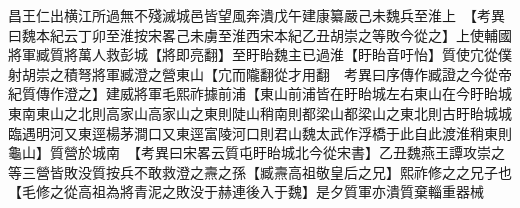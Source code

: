 昌王仁出横江所過無不殘滅城邑皆望風奔潰戊午建康纂嚴己未魏兵至淮上　【考異曰魏本紀云丁卯至淮按宋畧己未虜至淮西宋本紀乙丑胡崇之等敗今從之】上使輔國將軍臧質將萬人救彭城【將即亮翻】至盱眙魏主已過淮【盱眙音吁怡】質使宂從僕射胡崇之積弩將軍臧澄之營東山【宂而隴翻從才用翻　考異曰序傳作臧證之今從帝紀質傳作澄之】建威將軍毛熙祚據前浦【東山前浦皆在盱眙城左右東山在今盱眙城東南東山之北則高家山高家山之東則陡山稍南則都梁山都梁山之東北則古盱眙城城臨遇明河又東逕楊茅澗口又東逕富陵河口則君山魏太武作浮橋于此自此渡淮稍東則龜山】質營於城南　【考異曰宋畧云質屯盱眙城北今從宋書】乙丑魏燕王譚攻崇之等三營皆敗没質按兵不敢救澄之燾之孫【臧燾高祖敬皇后之兄】熙祚修之之兄子也【毛修之從高祖為將青泥之敗没于赫連後入于魏】是夕質軍亦潰質棄輜重器械